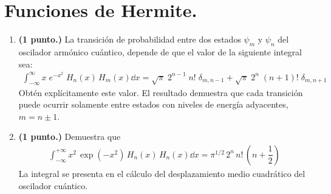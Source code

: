 \section{Funciones de Hermite.}

\begin{enumerate}
\item \textbf{(1 punto.) } La transición de probabilidad entre dos estados $\psi_{m}$ y $\psi_{n}$ del oscilador armónico cuántico, depende de que el valor de la siguiente integral sea:
\begin{align*}
\int_{-\infty}^{\infty} x \; e^{-x^{2}} \; H_{n} (x) \, H_{m}(x) \dd{x} = \sqrt{\pi} \; 2^{n-1} \; n! \; \delta_{m,n-1} + \sqrt{\pi} \; 2^{n} \; (n+1)! \; \delta_{m,n+1}
\end{align*}
Obtén explícitamente este valor. El resultado demuestra que cada transición puede ocurrir solamente entre estados con niveles de energía adyacentes, $m = n \pm 1$.
\item \textbf{(1 punto.) } Demuestra que
\begin{align*}
\int_{-\infty}^{+\infty} x^{2} \, \exp \left( -x^{2} \right) \, H_{n} (x) \, H_{n} (x) \dd{x} = \pi^{1/2} \, 2^{n} \, n! \, \left( n + \dfrac{1}{2} \right)
\end{align*}
La integral se presenta en el cálculo del desplazamiento medio cuadrático del oscilador cuántico.
\end{enumerate}
